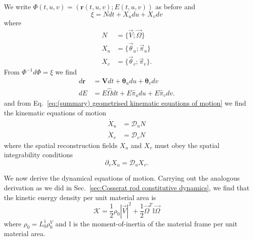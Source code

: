 We write $\Phi(t,u,v) = (\mathbf{r}(t, u,v) ; E(t,u,v))$ as before and
\begin{equation}
\xi = N dt + X_u du + X_v dv
\end{equation}
where
\begin{subequations} \label{eq:N X_alpha defs}
\begin{align}
N & = \{ \vec{V}; \vec{\Omega} \} \\
X_u & = \{ \vec{\theta}_u ; \vec{\pi}_u \} \\
X_v & = \{ \vec{\theta}_v ; \vec{\pi}_v \}.
\end{align}
\end{subequations}
From $\Phi^{-1} d \Phi = \xi$ we find
\begin{subequations} 
\begin{align}
d \mathbf{r} & = \mathbf{V} dt + \boldsymbol{\theta}_u du + \boldsymbol{\theta}_v dv  \\
d E & = E \hat{\Omega} dt + E \hat{\pi}_u du + E \hat{\pi}_v dv.
\end{align}
\end{subequations}
and from Eq.~\ref{eq:(summary) geometrised kinematic equations of motion} we find the kinematic equations of motion
\begin{subequations}
\begin{align}
\dot{X}_u & = \mathcal{D}_u N \\
\dot{X}_v & = \mathcal{D}_v N
\end{align}
\end{subequations}
where the spatial reconstruction fields $X_u$ and $X_v$ must obey the spatial integrability conditions
\begin{equation}
\partial_v X_u = \mathcal{D}_u X_v.
\end{equation}

We now derive the dynamical equations of motion. Carrying out the analogous derivation as we did in Sec.~\ref{sec:Cosserat rod constitutive dynamics}, we find that the kinetic energy density per unit material area is
\begin{equation}
\mathcal{K} = \frac{1}{2} \rho_0 |\vec{V}|^2 + \frac{1}{2} \vec{\Omega}^T \mathbb{I} \vec{\Omega} 
\end{equation}
where $\rho_0 = L_0^1 \rho_0^V$ and $\mathbb{I}$ is the moment-of-inertia of the material frame per unit material area.

